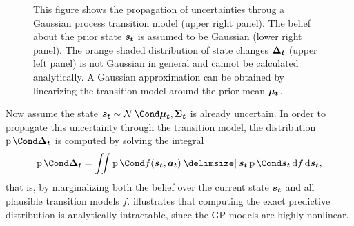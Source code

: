 \begin{figure}[p]
    \centering
    \caption[Uncertainty propagation using linearization]{
        This figure shows the propagation of uncertainties throug a Gaussian process transition model (upper right panel).
        The belief about the prior state $\bm{s_t}$ is assumed to be Gaussian (lower right panel).
        The orange shaded distribution of state changes $\bm{\Delta_t}$ (upper left panel) is not Gaussian in general and cannot be calculated analytically.
        A Gaussian approximation can be obtained by linearizing the transition model around the prior mean $\bm{\mu_t}$.
    }
    \label{fig:linearization}
\end{figure}
Now assume the state $\rv{s_t} \sim \Gaussian{\mat{\mu_t}, \mat{\Sigma_t}}$ is already uncertain.
In order to propagate this uncertainty through the transition model, the distribution $\Prob{\rv{\Delta_t}}$ is computed by solving the integral
\begin{align}
    \Prob{\rv{\Delta_t}} = \iint \Prob{f(\rv{s_t}, \mat{a_t}) \given \rv{s_t}} \Prob{\rv{s_t}} \diff f \diff \rv{s_t},
\end{align}
that is, by marginalizing both the belief over the current state $\bm{s_t}$ and all plausible transition models $f$.
 illustrates that computing the exact predictive distribution is analytically intractable, since the GP models are highly nonlinear.

